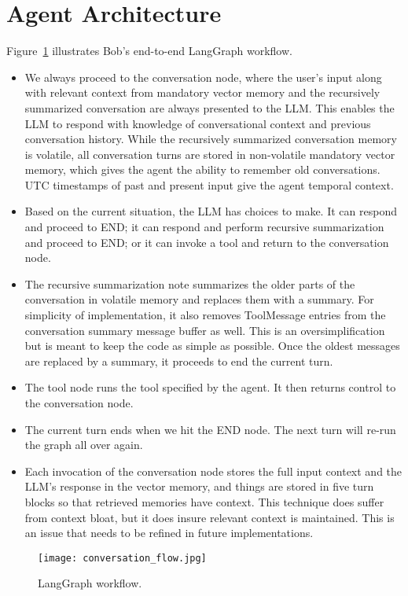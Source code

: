 \documentclass[11pt]{article}
\begin{document}
\section{Agent Architecture}
Figure~\ref{fig:workflow} illustrates Bob’s end-to-end LangGraph workflow.
\begin{itemize}[leftmargin=*]
  \item We always proceed to the conversation node, where the user's input along with relevant context from mandatory vector memory and the recursively summarized conversation are always presented to the LLM.  This enables the LLM to respond with knowledge of conversational context and previous conversation history.  While the recursively summarized conversation memory is volatile, all conversation turns are stored in non-volatile mandatory vector memory, which gives the agent the ability to remember old conversations.  UTC timestamps of past and present input give the agent temporal context.
  \item Based on the current situation, the LLM has choices to make.  It can respond and proceed to END; it can respond and perform recursive summarization and proceed to END; or it can invoke a tool and return to the conversation node.
  \item The recursive summarization note summarizes the older parts of the conversation in volatile memory and replaces them with a summary.  For simplicity of implementation, it also removes ToolMessage entries from the conversation summary message buffer as well.  This is an oversimplification but is meant to keep the code as simple as possible.  Once the oldest messages are replaced by a summary, it proceeds to end the current turn.
  \item The tool node runs the tool specified by the agent.  It then returns control to the conversation node.
  \item The current turn ends when we hit the END node.  The next turn will re-run the graph all over again.
  \item Each invocation of the conversation node stores the full input context and the LLM's response in the vector memory, and things are stored in five turn blocks so that retrieved memories have context.  This technique does suffer from context bloat, but it does insure relevant context is maintained.  This is an issue that needs to be refined in future implementations.
\end{itemize}

\begin{figure}[H]
  \centering
  \texttt{[image: conversation\_flow.jpg]}
  \caption{LangGraph workflow.}
  \label{fig:workflow}
\end{figure}
\end{document}
